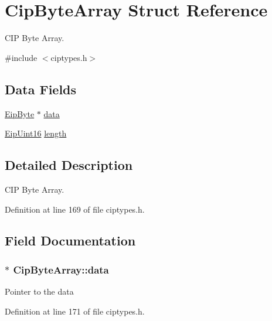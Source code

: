 \hypertarget{structCipByteArray}{\section{\-Cip\-Byte\-Array \-Struct \-Reference}
\label{de/dd7/structCipByteArray}
}


\-C\-I\-P \-Byte \-Array.  




{\ttfamily \#include $<$ciptypes.\-h$>$}

\subsection*{\-Data \-Fields}
\begin{DoxyCompactItemize}
\item 
\hyperlink{typedefs_8h_a168bac8db7e7e6d944700e1ac4717ae3}{\-Eip\-Byte} $\ast$ \hyperlink{structCipByteArray_ad1f95b3da0adfd2aeafd5db1d415a6b9}{data}
\item 
\hyperlink{typedefs_8h_ac1b4cfa25b4f5def62f23b455dd395d8}{\-Eip\-Uint16} \hyperlink{structCipByteArray_a2fc468bacd1d1300da4286bb838b7f7b}{length}
\end{DoxyCompactItemize}


\subsection{\-Detailed \-Description}
\-C\-I\-P \-Byte \-Array. 



\-Definition at line 169 of file ciptypes.\-h.



\subsection{\-Field \-Documentation}
\hypertarget{structCipByteArray_ad1f95b3da0adfd2aeafd5db1d415a6b9}{
\subsubsection[{data}]{$\ast$ {\bf \-Cip\-Byte\-Array\-::data}}}\label{de/dd7/structCipByteArray_ad1f95b3da0adfd2aeafd5db1d415a6b9}
\-Pointer to the data 

\-Definition at line 171 of file ciptypes.\-h.



